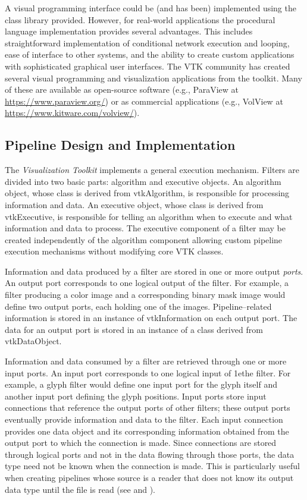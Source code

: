 A visual programming interface could be (and has been) implemented using the class library provided. However, for real-world applications the procedural language implementation provides several advantages. This includes straightforward implementation of conditional network execution and looping, ease of interface to other systems, and the ability to create custom applications with sophisticated graphical user interfaces. The VTK community has created several visual programming and visualization applications from the toolkit. Many of these are available as open-source software (e.g., ParaView at \href{https://www.paraview.org/}{https://www.paraview.org/}) or as commercial applications (e.g., VolView at \href{https://www.kitware.com/volview/}{https://www.kitware.com/volview/}).

\subsection{Pipeline Design and Implementation}
\label{subsec:pipeline_design_implementation}

The \emph{Visualization Toolkit} implements a general execution mechanism. Filters are divided into two basic parts: algorithm and executive objects. An algorithm object, whose class is derived from vtkAlgorithm, is responsible for processing information and data. An executive object, whose class is derived from vtkExecutive, is responsible for telling an algorithm when to execute and what information and data to process. The executive component of a filter may be created independently of the algorithm component allowing custom pipeline execution mechanisms without modifying core VTK classes.

Information and data produced by a filter are stored in one or more output \emph{ports}. An output port corresponds to one logical output of the filter. For example, a filter producing a color image and a corresponding binary mask image would define two output ports, each holding one of the images. Pipeline--related information is stored in an instance of vtkInformation on each output port. The data for an output port is stored in an instance of a class derived from vtkDataObject.

Information and data consumed by a filter are retrieved through one or more input ports. An input port corresponds to one logical input of 1ethe filter. For example, a glyph filter would define one input port for the glyph itself and another input port defining the glyph positions. Input ports store input connections that reference the output ports of other filters; these output ports eventually provide information and data to the filter. Each input connection provides one data object and its corresponding information obtained from the output port to which the connection is made. Since connections are stored through logical ports and not in the data flowing through those ports, the data type need not be known when the connection is made. This is particularly useful when creating pipelines whose source is a reader that does not know its output data type until the file is read (see  and ).

